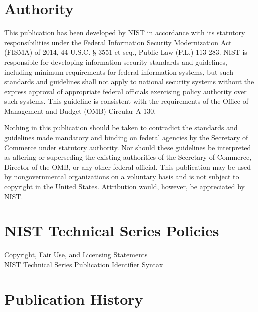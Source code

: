 \section*{Authority}

This publication has been developed by NIST in accordance with its statutory responsibilities under the Federal Information Security Modernization Act (FISMA) of 2014, 44 U.S.C. § 3551 et seq., Public Law (P.L.) 113-283. NIST is responsible for developing information security standards and guidelines, including minimum requirements for federal information systems, but such standards and guidelines shall not apply to national security systems without the express approval of appropriate federal officials exercising policy authority over such systems. This guideline is consistent with the requirements of the Office of Management and Budget (OMB) Circular A-130.

Nothing in this publication should be taken to contradict the standards and guidelines made mandatory and binding on federal agencies by the Secretary of Commerce under statutory authority. Nor should these guidelines be interpreted as altering or superseding the existing authorities of the Secretary of Commerce, Director of the OMB, or any other federal official.  This publication may be used by nongovernmental organizations on a voluntary basis and is not subject to copyright in the United States. Attribution would, however, be appreciated by NIST. 


\section*{NIST Technical Series Policies}

\href{https://doi.org/10.6028/NIST-TECHPUBS.CROSSMARK-POLICY}{Copyright, Fair Use, and Licensing Statements} \\
\href{https://www.nist.gov/nist-research-library/nist-technical-series-publications-author-instructions\#pubid}{NIST Technical Series Publication Identifier Syntax}


\section*{Publication History} %


\par %



